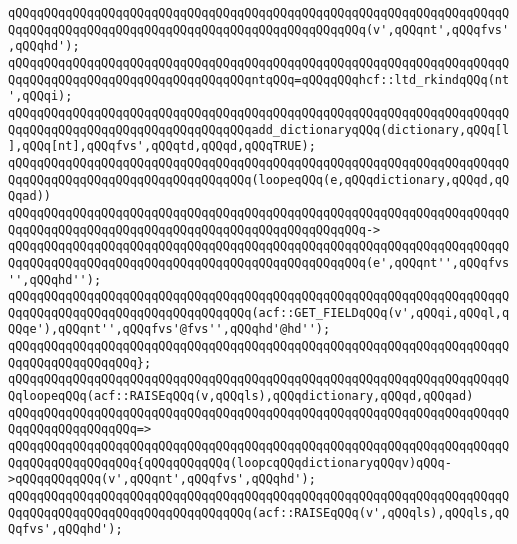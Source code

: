 \verb|qQQqqQQqqQQqqQQqqQQqqQQqqQQqqQQqqQQqqQQqqQQqqQQqqQQqqQQqqQQqqQQqqQQqqQQqqQQqqQQqqQQqqQQqqQQqqQQqqQQqqQQqqQQqqQQqqQQqqQQq(v',qQQqnt',qQQqfvs',qQQqhd');|\newline
\newline
\verb|qQQqqQQqqQQqqQQqqQQqqQQqqQQqqQQqqQQqqQQqqQQqqQQqqQQqqQQqqQQqqQQqqQQqqQQqqQQqqQQqqQQqqQQqqQQqqQQqqQQqqQQqntqQQq=qQQqqQQqhcf::ltd_rkindqQQq(nt',qQQqi);|\newline
\newline
\verb|qQQqqQQqqQQqqQQqqQQqqQQqqQQqqQQqqQQqqQQqqQQqqQQqqQQqqQQqqQQqqQQqqQQqqQQqqQQqqQQqqQQqqQQqqQQqqQQqqQQqqQQqadd_dictionaryqQQq(dictionary,qQQq[l],qQQq[nt],qQQqfvs',qQQqtd,qQQqd,qQQqTRUE);|\newline
\newline
\verb|qQQqqQQqqQQqqQQqqQQqqQQqqQQqqQQqqQQqqQQqqQQqqQQqqQQqqQQqqQQqqQQqqQQqqQQqqQQqqQQqqQQqqQQqqQQqqQQqqQQqqQQq(loopeqQQq(e,qQQqdictionary,qQQqd,qQQqad))|\newline
\verb|qQQqqQQqqQQqqQQqqQQqqQQqqQQqqQQqqQQqqQQqqQQqqQQqqQQqqQQqqQQqqQQqqQQqqQQqqQQqqQQqqQQqqQQqqQQqqQQqqQQqqQQqqQQqqQQqqQQqqQQq->|\newline
\verb|qQQqqQQqqQQqqQQqqQQqqQQqqQQqqQQqqQQqqQQqqQQqqQQqqQQqqQQqqQQqqQQqqQQqqQQqqQQqqQQqqQQqqQQqqQQqqQQqqQQqqQQqqQQqqQQqqQQqqQQq(e',qQQqnt'',qQQqfvs'',qQQqhd'');|\newline
\newline
\verb|qQQqqQQqqQQqqQQqqQQqqQQqqQQqqQQqqQQqqQQqqQQqqQQqqQQqqQQqqQQqqQQqqQQqqQQqqQQqqQQqqQQqqQQqqQQqqQQqqQQqqQQq(acf::GET_FIELDqQQq(v',qQQqi,qQQql,qQQqe'),qQQqnt'',qQQqfvs'@fvs'',qQQqhd'@hd'');|\newline
\verb|qQQqqQQqqQQqqQQqqQQqqQQqqQQqqQQqqQQqqQQqqQQqqQQqqQQqqQQqqQQqqQQqqQQqqQQqqQQqqQQqqQQqqQQq};|\newline
\newline
\verb|qQQqqQQqqQQqqQQqqQQqqQQqqQQqqQQqqQQqqQQqqQQqqQQqqQQqqQQqqQQqqQQqqQQqqQQqloopeqQQq(acf::RAISEqQQq(v,qQQqls),qQQqdictionary,qQQqd,qQQqad)|\newline
\verb|qQQqqQQqqQQqqQQqqQQqqQQqqQQqqQQqqQQqqQQqqQQqqQQqqQQqqQQqqQQqqQQqqQQqqQQqqQQqqQQqqQQqqQQq=>|\newline
\verb|qQQqqQQqqQQqqQQqqQQqqQQqqQQqqQQqqQQqqQQqqQQqqQQqqQQqqQQqqQQqqQQqqQQqqQQqqQQqqQQqqQQqqQQq{qQQqqQQqqQQq(loopcqQQqdictionaryqQQqv)qQQq->qQQqqQQqqQQq(v',qQQqnt',qQQqfvs',qQQqhd');|\newline
\newline
\verb|qQQqqQQqqQQqqQQqqQQqqQQqqQQqqQQqqQQqqQQqqQQqqQQqqQQqqQQqqQQqqQQqqQQqqQQqqQQqqQQqqQQqqQQqqQQqqQQqqQQqqQQq(acf::RAISEqQQq(v',qQQqls),qQQqls,qQQqfvs',qQQqhd');|\newline
